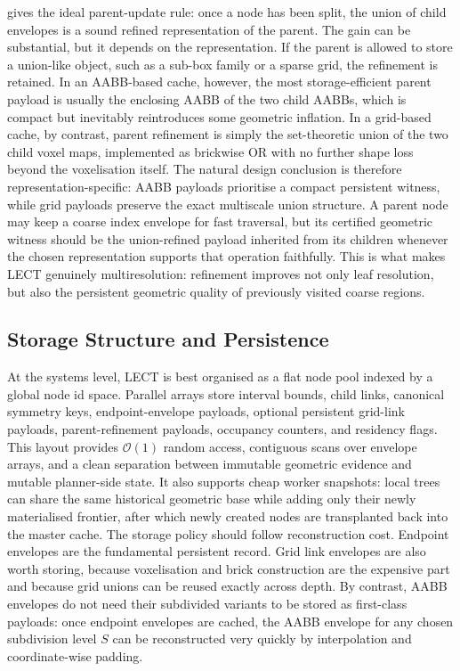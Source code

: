\documentclass[journal]{IEEEtran}
\begin{document}
 gives the ideal parent-update rule: once a node has
been split, the union of child envelopes is a sound refined representation of
the parent. The gain can be substantial, but it depends on the representation.
If the parent is allowed to store a union-like object, such as a sub-box family
or a sparse grid, the refinement is retained. In an AABB-based cache, however,
the most storage-efficient parent payload is usually the enclosing AABB of the
two child AABBs, which is compact but inevitably reintroduces some geometric
inflation. In a grid-based cache, by contrast, parent refinement is simply the
set-theoretic union of the two child voxel maps, implemented as brickwise OR
with no further shape loss beyond the voxelisation itself. The natural design
conclusion is therefore representation-specific: AABB payloads prioritise a
compact persistent witness, while grid payloads preserve the exact multiscale
union structure. A parent node may keep a coarse index envelope for fast
traversal, but its certified geometric witness should be the union-refined
payload inherited from its children whenever the chosen representation supports
that operation faithfully. This is what makes LECT genuinely multiresolution:
refinement improves not only leaf resolution, but also the persistent geometric
quality of previously visited coarse regions.

\subsection{Storage Structure and Persistence}\label{sec:lect_storage}

At the systems level, LECT is best organised as a flat node pool indexed by a
global node id space. Parallel arrays store interval bounds, child links,
canonical symmetry keys, endpoint-envelope payloads, optional persistent
grid-link payloads, parent-refinement payloads, occupancy counters, and
residency flags. This layout provides
$\mathcal{O}(1)$ random access, contiguous scans over envelope arrays, and a
clean separation between immutable geometric evidence and mutable planner-side
state. It also supports cheap worker snapshots: local trees can share the same
historical geometric base while adding only their newly materialised frontier,
after which newly created nodes are transplanted back into the master cache.
The storage policy should follow reconstruction cost. Endpoint envelopes are the
fundamental persistent record. Grid link envelopes are also worth storing,
because voxelisation and brick construction are the expensive part and because
grid unions can be reused exactly across depth. By contrast, AABB envelopes do
not need their subdivided variants to be stored as first-class payloads: once
endpoint envelopes are cached, the AABB envelope for any chosen subdivision
level $S$ can be reconstructed very quickly by interpolation and
coordinate-wise padding.
\end{document}
